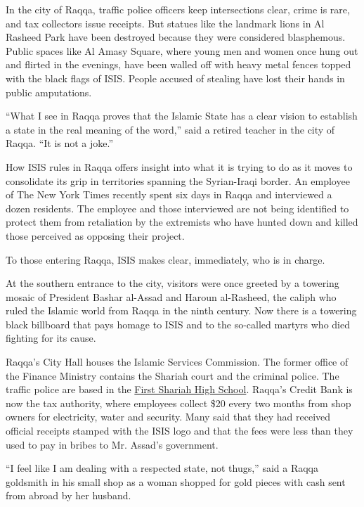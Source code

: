 In the city of Raqqa, traffic police officers keep intersections clear,
crime is rare, and tax collectors issue receipts. But statues like the
landmark lions in Al Rasheed Park have been destroyed because they were
considered blasphemous. Public spaces like Al Amasy Square, where young
men and women once hung out and flirted in the evenings, have been
walled off with heavy metal fences topped with the black flags of ISIS.
People accused of stealing have lost their hands in public amputations.

``What I see in Raqqa proves that the Islamic State has a clear vision
to establish a state in the real meaning of the word,'' said a retired
teacher in the city of Raqqa. ``It is not a joke.''

How ISIS rules in Raqqa offers insight into what it is trying to do as
it moves to consolidate its grip in territories spanning the
Syrian-Iraqi border. An employee of The New York Times recently spent
six days in Raqqa and interviewed a dozen residents. The employee and
those interviewed are not being identified to protect them from
retaliation by the extremists who have hunted down and killed those
perceived as opposing their project.

To those entering Raqqa, ISIS makes clear, immediately, who is in
charge.

At the southern entrance to the city, visitors were once greeted by a
towering mosaic of President Bashar al-Assad and Haroun al-Rasheed, the
caliph who ruled the Islamic world from Raqqa in the ninth century. Now
there is a towering black billboard that pays homage to ISIS and to the
so-called martyrs who died fighting for its cause.

Raqqa's City Hall houses the Islamic Services Commission. The former
office of the Finance Ministry contains the Shariah court and the
criminal police. The traffic police are based in the
\href{https://twitter.com/al_khansaa2/status/465938930878398465/photo/1}{First
Shariah High School}. Raqqa's Credit Bank is now the tax authority,
where employees collect \$20 every two months from shop owners for
electricity, water and security. Many said that they had received
official receipts stamped with the ISIS logo and that the fees were less
than they used to pay in bribes to Mr. Assad's government.

``I feel like I am dealing with a respected state, not thugs,'' said a
Raqqa goldsmith in his small shop as a woman shopped for gold pieces
with cash sent from abroad by her husband.

